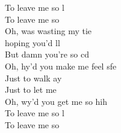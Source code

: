 \begin{cancion}
\begin{chorus}
	To leave me so l\\
	To leave me so\\
	Oh,  was wasting my tie \\
	hoping you'd ll\\
	But damn you're so cd\\
	Oh, hy'd you make me feel sfe\\
	Just to walk ay\\
	Just to let me \\
	Oh, wy'd you get me so hih\\
	To leave me so l\\
	To leave me so\\
	\end{chorus}%
	\jump\\
\end{cancion}%
